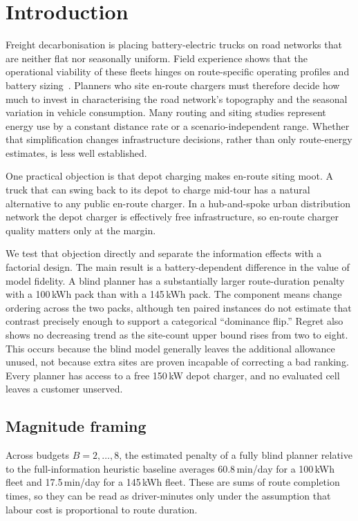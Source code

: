 \documentclass[review,3p,authoryear]{elsarticle}
\begin{document}
\section{Introduction}
\label{sec:intro}

Freight decarbonisation is placing battery-electric trucks on road
networks that are neither flat nor seasonally uniform.  Field experience
shows that the operational viability of these fleets hinges on
route-specific operating profiles and battery
sizing~\citep{Link2022,Hovi2019}.  Planners who site en-route chargers
must therefore decide how much to invest in characterising the road
network's topography and the seasonal variation in vehicle consumption.
Many routing and siting studies represent energy use by a constant
distance rate or a scenario-independent range.  Whether that simplification
changes infrastructure decisions, rather than only route-energy estimates,
is less well established.

One practical objection is that depot charging makes en-route siting moot.
A truck
that can swing back to its depot to charge mid-tour has a natural
alternative to any public en-route charger.  In a hub-and-spoke urban
distribution network the depot charger is effectively free infrastructure,
so en-route charger quality matters only at the margin.

We test that objection directly and separate the information effects with
a factorial design.  The main result is a battery-dependent difference in
the value of model fidelity.  A blind planner has a substantially larger
route-duration penalty with a 100\,kWh pack than with a 145\,kWh pack.
The component means change ordering across the two packs, although ten
paired instances do not estimate that contrast precisely enough to support
a categorical ``dominance flip.''  Regret also shows no decreasing trend as
the site-count upper bound rises from two to eight.  This occurs because the
blind model generally leaves the additional allowance unused, not because
extra sites are proven incapable of correcting a bad ranking.  Every planner
has access to a free 150\,kW depot charger, and no evaluated cell leaves a
customer unserved.

\subsection*{Magnitude framing}

Across budgets $B=2,\ldots,8$, the estimated penalty of a fully blind
planner relative to the full-information heuristic baseline averages
60.8\,min/day for a 100\,kWh fleet and 17.5\,min/day for a 145\,kWh
fleet.  These are sums of route completion times, so they can be read as
driver-minutes only under the assumption that labour cost is proportional
to route duration.
\end{document}

